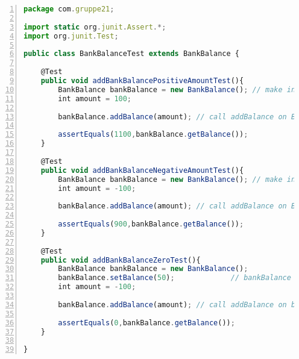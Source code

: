 \begin{lstlisting}[language=JavaScript,numbers=left]
package com.gruppe21;

import static org.junit.Assert.*;
import org.junit.Test;

public class BankBalanceTest extends BankBalance {

    @Test
    public void addBankBalancePositiveAmountTest(){
        BankBalance bankBalance = new BankBalance(); // make instance of BankBalance called bankBalance
        int amount = 100;

        bankBalance.addBalance(amount); // call addBalance on BankBalance

        assertEquals(1100,bankBalance.getBalance());
    }

    @Test
    public void addBankBalanceNegativeAmountTest(){
        BankBalance bankBalance = new BankBalance(); // make instance of BankBalance called bankBalance
        int amount = -100;

        bankBalance.addBalance(amount); // call addBalance on BankBalance

        assertEquals(900,bankBalance.getBalance());
    }

    @Test
    public void addBankBalanceZeroTest(){
        BankBalance bankBalance = new BankBalance();
        bankBalance.setBalance(50);             // bankBalance set to 50
        int amount = -100;

        bankBalance.addBalance(amount); // call addBalance on bankBalance

        assertEquals(0,bankBalance.getBalance());
    }

}

\end{lstlisting}

